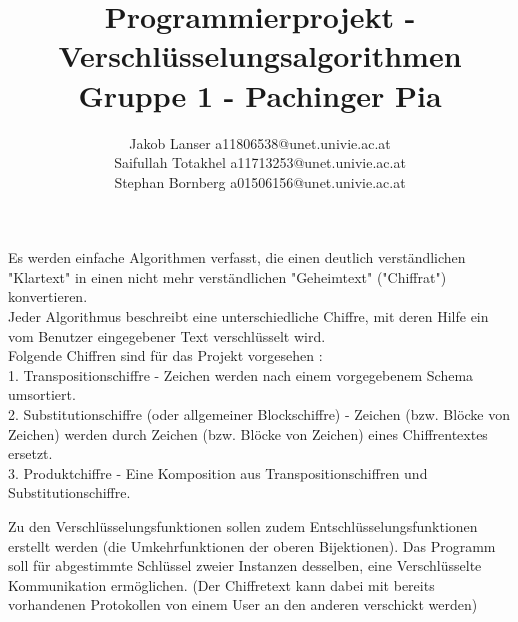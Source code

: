 \documentclass{article}
\title{Programmierprojekt - Verschlüsselungsalgorithmen\\Gruppe 1 -  Pachinger Pia}
\author{Jakob Lanser a11806538@unet.univie.ac.at\\Saifullah Totakhel a11713253@unet.univie.ac.at\\Stephan Bornberg a01506156@unet.univie.ac.at}
\begin{document}
\maketitle

Es werden einfache Algorithmen verfasst, die einen deutlich verständlichen "Klartext" in einen nicht mehr verständlichen "Geheimtext" ("Chiffrat") konvertieren.\\
Jeder Algorithmus beschreibt eine unterschiedliche Chiffre, mit deren Hilfe ein vom Benutzer eingegebener Text verschlüsselt wird.\\
Folgende Chiffren sind für das Projekt vorgesehen :\\
1. Transpositionschiffre - Zeichen werden nach einem vorgegebenem Schema umsortiert.\\
2. Substitutionschiffre (oder allgemeiner Blockschiffre) - Zeichen (bzw. Blöcke von Zeichen) werden durch Zeichen (bzw. Blöcke von Zeichen) eines Chiffrentextes ersetzt.\\
3. Produktchiffre - Eine Komposition aus Transpositionschiffren und Substitutionschiffre.

Zu den Verschlüsselungsfunktionen sollen zudem Entschlüsselungsfunktionen erstellt werden (die Umkehrfunktionen der oberen Bijektionen). Das Programm soll für abgestimmte Schlüssel zweier Instanzen desselben, eine Verschlüsselte Kommunikation ermöglichen. (Der Chiffretext kann dabei mit bereits vorhandenen Protokollen von einem User an den anderen verschickt werden)
\end{document}
